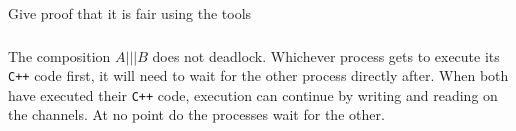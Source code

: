 \documentclass[a4paper,twoside,11pt]{article}
\newcommand{\cpp}{{\tt C++} }
\begin{document}
\color{red}
Give proof that it is fair using the tools
\color{black}

\subsubsection{}
The composition $A ||| B$ does not deadlock. Whichever process gets to execute its \cpp code first, it will need to wait for the other process directly after. When both have executed their \cpp code, execution can continue by writing and reading on the channels. At no point do the processes wait for the other.
\end{document}

